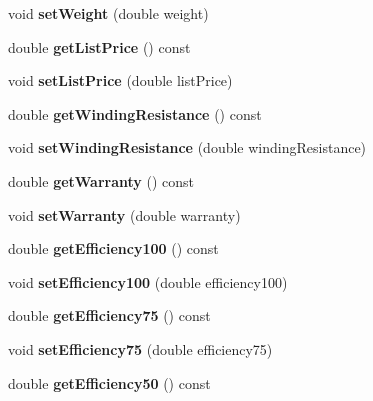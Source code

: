 \begin{DoxyCompactItemize}
void {\bfseries set\+Weight} (double weight)
\item 
\mbox{\label{class_motor_data_a73b5f609b313e1b071da76f0c2430649}} 
double {\bfseries get\+List\+Price} () const
\item 
\mbox{\label{class_motor_data_addbfade0ae45f1b49554a923c819debb}} 
void {\bfseries set\+List\+Price} (double list\+Price)
\item 
\mbox{\label{class_motor_data_a4ce68beb85d4b904e173c2570c04846b}} 
double {\bfseries get\+Winding\+Resistance} () const
\item 
\mbox{\label{class_motor_data_a4dd9a4f231dc0fce6ba8a780bf5d7796}} 
void {\bfseries set\+Winding\+Resistance} (double winding\+Resistance)
\item 
\mbox{\label{class_motor_data_a3d0da64855a76a96e17bedb9b94aa5a7}} 
double {\bfseries get\+Warranty} () const
\item 
\mbox{\label{class_motor_data_affd407ad3b6e18b3c611b5c82a986737}} 
void {\bfseries set\+Warranty} (double warranty)
\item 
\mbox{\label{class_motor_data_af71f431074380c5251522ea0a30dd450}} 
double {\bfseries get\+Efficiency100} () const
\item 
\mbox{\label{class_motor_data_a61ba89edc6ec243f8012a11aaed5eaa9}} 
void {\bfseries set\+Efficiency100} (double efficiency100)
\item 
\mbox{\label{class_motor_data_a953c733a4409ff686329e2bb89c1af8a}} 
double {\bfseries get\+Efficiency75} () const
\item 
\mbox{\label{class_motor_data_afccbaa43b470f6576647851cc9d356d6}} 
void {\bfseries set\+Efficiency75} (double efficiency75)
\item 
\mbox{\label{class_motor_data_a07d861b745f8d2a09c8e7540a6fe65ed}} 
double {\bfseries get\+Efficiency50} () const
\item 

\end{DoxyCompactItemize}
